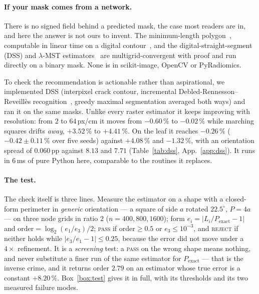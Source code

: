 \documentclass{article}
\newcommand{\pct}[1]{$#1\,\%$}
\begin{document}
\paragraph{If your mask comes from a network.} There is no signed field behind a predicted mask,
the case most readers are in, and here the answer is not ours to invent. The minimum-length
polygon~\citep{sloboda1998}, computable in linear time on a digital contour~\citep{provencal2009},
and the digital-straight-segment (DSS) and $\lambda$-MST
estimators~\citep{kovalevsky1992,lachaud2007} are multigrid-convergent with proof and run directly
on a binary mask. None is in scikit-image, OpenCV or PyRadiomics.

To check the recommendation is actionable rather than aspirational, we implemented DSS
(interpixel crack contour, incremental Debled-Rennesson--Reveill\`es
recognition~\citep{debledrennesson1995}, greedy maximal segmentation averaged both ways) and ran
it on the same masks. Unlike every raster estimator it keeps improving with
resolution: from $2$ to $64$\,px/cm it moves from \pct{-0.60} to \pct{-0.02} while marching
squares drifts \emph{away}, \pct{+3.52} to \pct{+4.41}. On the leaf it reaches \pct{-0.26}
(\pct{-0.42 \pm 0.11} over five seeds) against \pct{+4.08} and \pct{-1.32}, with an orientation
spread of $0.060$\,pp against $8.13$ and $7.71$ (Table~\ref{tab:dss}, App.~\ref{app:dss}). It runs
in $6$\,ms of pure Python here, comparable to the routines it replaces.

\paragraph{The test.} The check itself is three lines. Measure the estimator on a shape with a
closed-form perimeter in \emph{generic} orientation --- a square of side $a$ rotated $22.5^\circ$,
$P = 4a$ --- on three node grids in ratio $2$ ($n = 400, 800, 1600$); form
$e_i = |L_i/P_{\text{exact}} - 1|$ and $\text{order} = \log_2(e_1/e_3)/2$; \textsc{pass} if
$\text{order} \ge 0.5$ or $e_3 \le 10^{-3}$, and \textsc{reject} if neither holds while
$|e_3/e_1 - 1| \le 0.25$, because the error did not move under a $4\times$ refinement. It is a
\emph{screening} test: a \textsc{pass} on the wrong shape means nothing, and never substitute a
finer run of the same estimator for $P_{\text{exact}}$ --- that is the inverse crime, and it returns
order $2.79$ on an estimator whose true error is a constant \pct{+8.20}. Box~\ref{box:test} gives
it in full, with its thresholds and its two measured failure modes.
\end{document}
